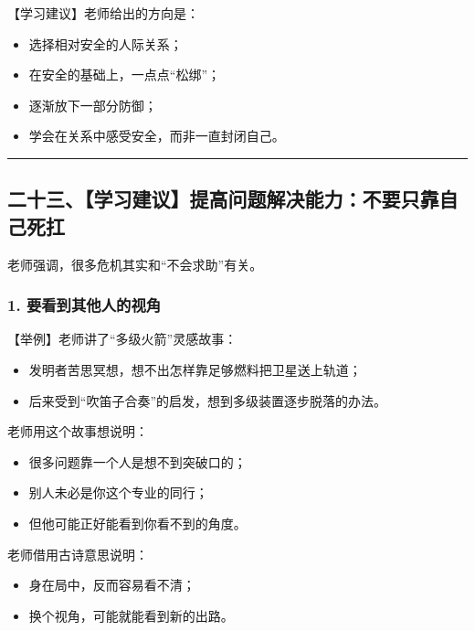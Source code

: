 \documentclass[
  chinese,
  9pt,
  a4paper,
]{ctexart}
\providecommand{\tightlist}{%
  \setlength{\itemsep}{0pt}\setlength{\parskip}{0pt}}
\begin{document}
【学习建议】老师给出的方向是：

\begin{itemize}
\tightlist
\item
  选择相对安全的人际关系；
\item
  在安全的基础上，一点点``松绑''；
\item
  逐渐放下一部分防御；
\item
  学会在关系中感受安全，而非一直封闭自己。
\end{itemize}

\begin{center}\rule{0.5\linewidth}{0.5pt}\end{center}

\subsection{二十三、【学习建议】提高问题解决能力：不要只靠自己死扛}\label{ux4e8cux5341ux4e09ux5b66ux4e60ux5efaux8baeux63d0ux9ad8ux95eeux9898ux89e3ux51b3ux80fdux529bux4e0dux8981ux53eaux9760ux81eaux5df1ux6b7bux625b}

老师强调，很多危机其实和``不会求助''有关。

\subsubsection{1.
要看到其他人的视角}\label{ux8981ux770bux5230ux5176ux4ed6ux4ebaux7684ux89c6ux89d2}

【举例】老师讲了``多级火箭''灵感故事：

\begin{itemize}
\tightlist
\item
  发明者苦思冥想，想不出怎样靠足够燃料把卫星送上轨道；
\item
  后来受到``吹笛子合奏''的启发，想到多级装置逐步脱落的办法。
\end{itemize}

老师用这个故事想说明：

\begin{itemize}
\tightlist
\item
  很多问题靠一个人是想不到突破口的；
\item
  别人未必是你这个专业的同行；
\item
  但他可能正好能看到你看不到的角度。
\end{itemize}

老师借用古诗意思说明：

\begin{itemize}
\tightlist
\item
  身在局中，反而容易看不清；
\item
  换个视角，可能就能看到新的出路。
\end{itemize}
\end{document}
